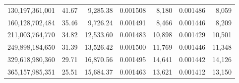\begin{tabular}{@{}rrrrrrr@{}}
130,197,361,001 & 41.67 & 9,285.38 & 0.001508 & 8,180 & 0.001486 & 8,059 \\
160,128,702,484 & 35.46 & 9,726.24 & 0.001491 & 8,466 & 0.001446 & 8,209 \\
211,003,764,770 & 34.82 & 12,533.60 & 0.001483 & 10,898 & 0.001429 & 10,501 \\
249,898,184,650 & 31.39 & 13,526.42 & 0.001500 & 11,769 & 0.001446 & 11,348 \\
329,618,980,360 & 29.71 & 16,870.56 & 0.001495 & 14,641 & 0.001442 & 14,126 \\
365,157,985,351 & 25.51 & 15,684.37 & 0.001463 & 13,621 & 0.001412 & 13,150 \\
\bottomrule
\end{tabular}
